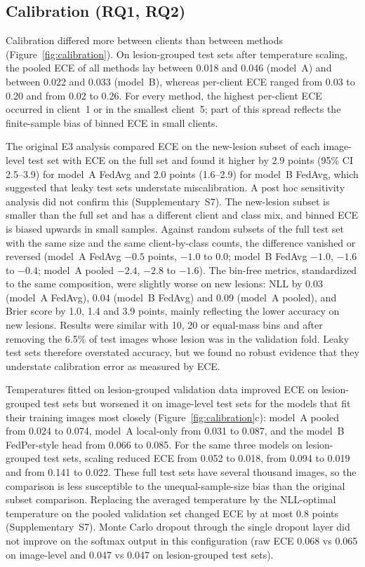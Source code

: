 \subsection{Calibration (RQ1, RQ2)}
\label{sec:res-calibration}

Calibration differed more between clients than between methods (Figure~\ref{fig:calibration}). On
lesion-grouped test sets after temperature scaling, the pooled ECE of all methods lay between 0.018 and
0.046 (model~A) and between 0.022 and 0.033 (model~B), whereas per-client ECE ranged from 0.03 to 0.20
and from 0.02 to 0.26. For every method, the highest per-client ECE occurred in client~1 or in the
smallest client~5; part of this spread reflects the finite-sample bias of binned ECE in small clients.

The original E3 analysis compared ECE on the new-lesion subset of each image-level test set with ECE on the
full set and found it higher by 2.9 points (95\% CI 2.5--3.9) for model~A FedAvg and 2.0 points (1.6--2.9)
for model~B FedAvg, which suggested that leaky test sets understate miscalibration. A post hoc sensitivity
analysis did not confirm this (Supplementary~S7). The new-lesion subset is smaller than the full set and
has a different client and class mix, and binned ECE is biased upwards in small samples. Against random
subsets of the full test set with the same size and the same client-by-class counts, the difference
vanished or reversed (model~A FedAvg $-0.5$ points, $-1.0$ to 0.0; model~B FedAvg $-1.0$, $-1.6$ to
$-0.4$; model~A pooled $-2.4$, $-2.8$ to $-1.6$). The bin-free metrics, standardized to the same
composition, were slightly worse on new lesions: NLL by 0.03 (model~A FedAvg), 0.04 (model~B FedAvg) and
0.09 (model~A pooled), and Brier score by 1.0, 1.4 and 3.9 points, mainly reflecting the lower accuracy on
new lesions. Results were similar with 10, 20 or equal-mass bins and after removing the 6.5\% of test
images whose lesion was in the validation fold. Leaky test sets therefore overstated accuracy, but we found
no robust evidence that they understate calibration error as measured by ECE.

Temperatures fitted on lesion-grouped validation data improved ECE on lesion-grouped test sets but worsened
it on image-level test sets for the models that fit their training images most closely
(Figure~\ref{fig:calibration}c): model~A pooled from 0.024 to 0.074, model~A local-only from 0.031 to 0.087,
and the model~B FedPer-style head from 0.066 to 0.085. For the same three models on lesion-grouped test
sets, scaling reduced ECE from 0.052 to 0.018, from 0.094 to 0.019 and from 0.141 to 0.022. These full test
sets have several thousand images, so the comparison is less susceptible to the unequal-sample-size bias than the original subset comparison. Replacing
the averaged temperature by the NLL-optimal temperature on the pooled validation set changed ECE by at
most 0.8 points (Supplementary~S7). Monte Carlo dropout through the single dropout layer did not
improve on the softmax output in this configuration (raw ECE 0.068 vs 0.065 on image-level and 0.047 vs
0.047 on lesion-grouped test sets).

